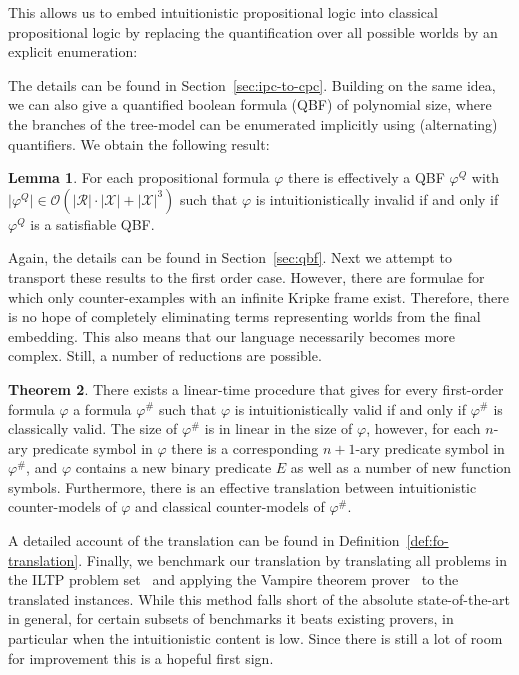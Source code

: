 \documentclass{easychair}
\theoremstyle{definition}
\newtheorem{theorem}{Theorem}[section]
\theoremstyle{definition}
\theoremstyle{definition}
\newtheorem{lemma}[theorem]{Lemma}
\theoremstyle{definition}
\theoremstyle{definition}
\theoremstyle{definition}
\theoremstyle{definition}
\begin{document}
This allows us to embed intuitionistic propositional logic into classical propositional logic by replacing the quantification over all possible worlds by an explicit enumeration:






The details can be found in Section~\ref{sec:ipc-to-cpc}.
Building on the same idea, we can also give a quantified boolean formula (QBF) of polynomial size, where the branches of the tree-model can be enumerated implicitly using (alternating) quantifiers. We obtain the following result:


\begin{lemma}
	For each propositional formula $\varphi$ there is effectively a QBF $\varphi^Q$ with $\mathcal |\varphi^Q|\in\mathcal O(|\mathcal R|\cdot|\mathcal X| + |\mathcal X|^3)$ such that $\varphi$ is intuitionistically invalid if and only if $\varphi^Q$ is a satisfiable QBF.
\end{lemma}

Again, the details can be found in Section~\ref{sec:qbf}.
Next we attempt to transport these results to the first order case. However, there are formulae for which only counter-examples with an infinite Kripke frame exist. Therefore, there is no hope of completely eliminating terms representing worlds from the final embedding. This also means that our language necessarily becomes more complex. Still, a number of reductions are possible.

\begin{theorem}
	\label{thm:reduction-first-order-short}
	There exists a linear-time procedure that gives for every first-order formula $\varphi$ a formula $\varphi^\#$ such that $\varphi$ is intuitionistically valid if and only if $\varphi^\#$ is classically valid. The size of $\varphi^\#$ is in linear in the size of $\varphi$, however, for each $n$-ary predicate symbol in $\varphi$ there is a corresponding $n+1$-ary predicate symbol in $\varphi^\#$, and $\varphi$ contains a new binary predicate $E$ as well as a number of new function symbols. Furthermore, there is an effective translation between intuitionistic counter-models of $\varphi$ and classical counter-models of $\varphi^\#$.
\end{theorem}

A detailed account of the translation can be found in Definition~\ref{def:fo-translation}. Finally, we benchmark our translation by translating all problems in the ILTP problem set~\cite{iltp} and applying the Vampire theorem prover~\cite{kovacs2013first} to the translated instances. While this method falls short of the absolute state-of-the-art in general, for certain subsets of benchmarks it beats existing provers, in particular when the intuitionistic content is low. Since there is still a lot of room for improvement this is a hopeful first sign.
\end{document}
